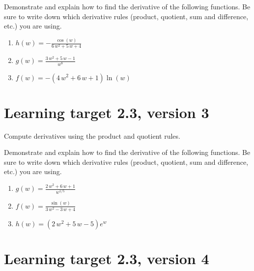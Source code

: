 \hrulefill

Demonstrate and explain how to find the derivative of the following functions. Be sure to write down which derivative rules (product, quotient, sum and difference, etc.) you are using.

\begin{enumerate}
    \item \(\renewcommand{\log}{\ln} h(w)= -\frac{\cos\left(w\right)}{6 \, w^{2} + 5 \, w + 4}\)
    \vfill
    \item \( \renewcommand{\log}{\ln} g(w)= \frac{3 \, w^{2} + 5 \, w - 1}{w^{8}}\)
    \vfill
    \item \(\renewcommand{\log}{\ln} f(w)= -{\left(4 \, w^{2} + 6 \, w + 1\right)} \log\left(w\right)\)
    \vfill
\end{enumerate}

\pagebreak

\section{Learning target 2.3, version 3}

Compute derivatives using the product and quotient rules.

\hrulefill

Demonstrate and explain how to find the derivative of the following functions. Be sure to write down which derivative rules (product, quotient, sum and difference, etc.) you are using.

\begin{enumerate}
    \item \(\renewcommand{\log}{\ln} g(w)= \frac{2 \, w^{2} + 6 \, w + 1}{w^{1/5}}\)
    \vfill
    \item \(\renewcommand{\log}{\ln} f(w)= \frac{\sin\left(w\right)}{3 \, w^{2} - 3 \, w + 4}\)
    \vfill
    \item \(\renewcommand{\log}{\ln} h(w)= {\left(2 \, w^{2} + 5 \, w - 5\right)} e^{w}\)
    \vfill
\end{enumerate}

\pagebreak

\section{Learning target 2.3, version 4}

